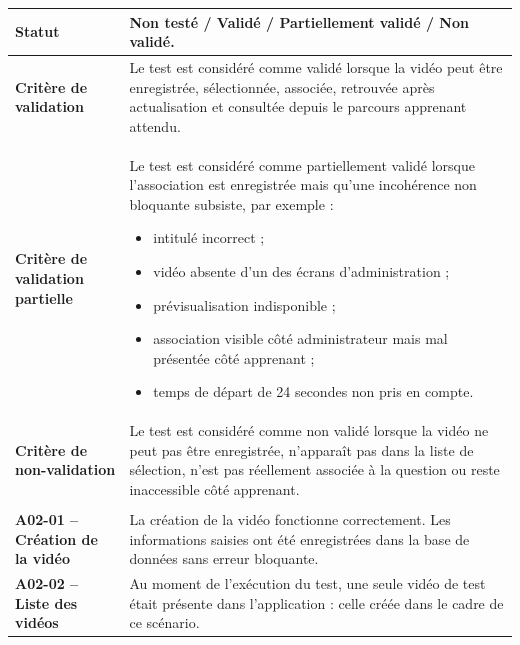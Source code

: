 \begin{longtable}{
    |>{\raggedright\arraybackslash}p{}
    |>{\raggedright\arraybackslash}p{}|
}
\textbf{Statut}
&
Non testé / Validé / Partiellement validé / Non validé.
\\
\hline

\textbf{Critère de validation}
&
Le test est considéré comme validé lorsque la vidéo peut être enregistrée,
sélectionnée, associée, retrouvée après actualisation et consultée depuis
le parcours apprenant attendu.
\\
\hline

\textbf{Critère de validation partielle}
&
Le test est considéré comme partiellement validé lorsque l'association est
enregistrée mais qu'une incohérence non bloquante subsiste, par exemple :

\begin{itemize}[leftmargin=*,nosep]
    \item intitulé incorrect ;
    \item vidéo absente d'un des écrans d'administration ;
    \item prévisualisation indisponible ;
    \item association visible côté administrateur mais mal présentée côté
    apprenant ;
    \item temps de départ de 24 secondes non pris en compte.
\end{itemize}
\\
\hline

\textbf{Critère de non-validation}
&
Le test est considéré comme non validé lorsque la vidéo ne peut pas être
enregistrée, n'apparaît pas dans la liste de sélection, n'est pas réellement
associée à la question ou reste inaccessible côté apprenant.
\\
\hline


\rowcolor{orange!50}
\multicolumn{2}{|c|}{
    \textbf{Commentaires, observations et anomalies constatées}
}
\\
\hline

\textbf{A02-01 -- Création de la vidéo}
&
La création de la vidéo fonctionne correctement. Les informations saisies
ont été enregistrées dans la base de données sans erreur bloquante.
\\
\hline

\textbf{A02-02 -- Liste des vidéos}
&
Au moment de l'exécution du test, une seule vidéo de test était présente
dans l'application : celle créée dans le cadre de ce scénario.


\end{longtable}
